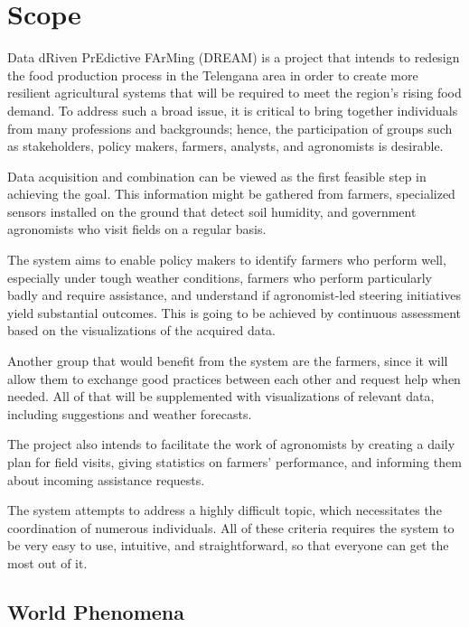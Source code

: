 \section{Scope}

Data dRiven PrEdictive FArMing (DREAM) is a project that intends to redesign the food production process in the Telengana area in order to create more resilient agricultural systems that will be required to meet the region's rising food demand. To address such a broad issue, it is critical to bring together individuals from many professions and backgrounds; hence, the participation of groups such as stakeholders, policy makers, farmers, analysts, and agronomists is desirable.

Data acquisition and combination can be viewed as the first feasible step in achieving the goal. This information might be gathered from farmers, specialized sensors installed on the ground that detect soil humidity, and government agronomists who visit fields on a regular basis.

The system aims to enable policy makers to identify farmers who perform well, especially under tough weather conditions, farmers who perform particularly badly and require assistance, and understand if agronomist-led steering initiatives yield substantial outcomes. This is going to be achieved by continuous assessment based on the visualizations of the acquired data.

Another group that would benefit from the system are the farmers, since it will allow them to exchange good practices between each other and request help when needed. All of that will be supplemented with visualizations of relevant data, including suggestions and weather forecasts.

The project also intends to facilitate the work of agronomists by creating a daily plan for field visits, giving statistics on farmers' performance, and informing them about incoming assistance requests.

The system attempts to address a highly difficult topic, which necessitates the coordination of numerous individuals. All of these criteria requires the system to be very easy to use, intuitive, and straightforward, so that everyone can get the most out of it.

\subsection{World Phenomena}

